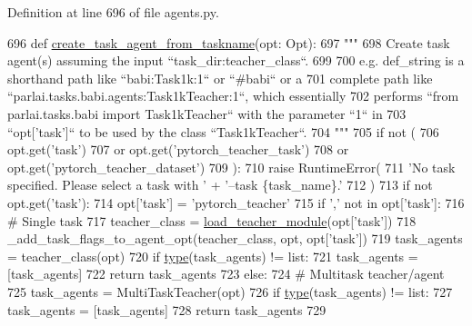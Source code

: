 Definition at line 696 of file agents.\+py.


\begin{DoxyCode}
696 \textcolor{keyword}{def }\hyperlink{namespaceparlai_1_1core_1_1agents_a76269fb567532a8fb7f29edcc20a6e47}{create\_task\_agent\_from\_taskname}(opt: Opt):
697     \textcolor{stringliteral}{"""}
698 \textcolor{stringliteral}{    Create task agent(s) assuming the input ``task\_dir:teacher\_class``.}
699 \textcolor{stringliteral}{}
700 \textcolor{stringliteral}{    e.g. def\_string is a shorthand path like ``babi:Task1k:1`` or ``#babi`` or a}
701 \textcolor{stringliteral}{    complete path like ``parlai.tasks.babi.agents:Task1kTeacher:1``, which essentially}
702 \textcolor{stringliteral}{    performs ``from parlai.tasks.babi import Task1kTeacher`` with the parameter ``1`` in}
703 \textcolor{stringliteral}{    ``opt['task']`` to be used by the class ``Task1kTeacher``.}
704 \textcolor{stringliteral}{    """}
705     \textcolor{keywordflow}{if} \textcolor{keywordflow}{not} (
706         opt.get(\textcolor{stringliteral}{'task'})
707         \textcolor{keywordflow}{or} opt.get(\textcolor{stringliteral}{'pytorch\_teacher\_task'})
708         \textcolor{keywordflow}{or} opt.get(\textcolor{stringliteral}{'pytorch\_teacher\_dataset'})
709     ):
710         \textcolor{keywordflow}{raise} RuntimeError(
711             \textcolor{stringliteral}{'No task specified. Please select a task with '} + \textcolor{stringliteral}{'--task \{task\_name\}.'}
712         )
713     \textcolor{keywordflow}{if} \textcolor{keywordflow}{not} opt.get(\textcolor{stringliteral}{'task'}):
714         opt[\textcolor{stringliteral}{'task'}] = \textcolor{stringliteral}{'pytorch\_teacher'}
715     \textcolor{keywordflow}{if} \textcolor{stringliteral}{','} \textcolor{keywordflow}{not} \textcolor{keywordflow}{in} opt[\textcolor{stringliteral}{'task'}]:
716         \textcolor{comment}{# Single task}
717         teacher\_class = \hyperlink{namespaceparlai_1_1core_1_1loader_a9eed9fa0f15170da9d4de24c2c3d4e2a}{load\_teacher\_module}(opt[\textcolor{stringliteral}{'task'}])
718         \_add\_task\_flags\_to\_agent\_opt(teacher\_class, opt, opt[\textcolor{stringliteral}{'task'}])
719         task\_agents = teacher\_class(opt)
720         \textcolor{keywordflow}{if} \hyperlink{namespaceparlai_1_1agents_1_1tfidf__retriever_1_1build__tfidf_ad5dfae268e23f506da084a9efb72f619}{type}(task\_agents) != list:
721             task\_agents = [task\_agents]
722         \textcolor{keywordflow}{return} task\_agents
723     \textcolor{keywordflow}{else}:
724         \textcolor{comment}{# Multitask teacher/agent}
725         task\_agents = MultiTaskTeacher(opt)
726         \textcolor{keywordflow}{if} \hyperlink{namespaceparlai_1_1agents_1_1tfidf__retriever_1_1build__tfidf_ad5dfae268e23f506da084a9efb72f619}{type}(task\_agents) != list:
727             task\_agents = [task\_agents]
728         \textcolor{keywordflow}{return} task\_agents
729 \end{DoxyCode}
